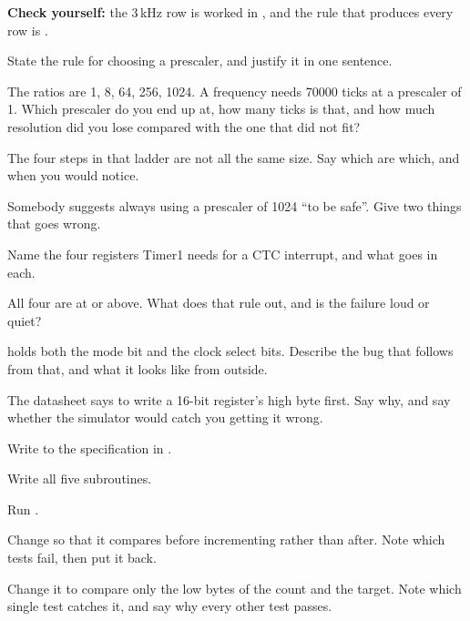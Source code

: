 \noindent\textbf{Check yourself:} the 3\,kHz row is worked in , and the rule
that produces every row is .

\label{c5:ex:choose}
\begin{parts}
  \item State the rule for choosing a prescaler, and justify it in one sentence.
  \item The ratios are 1, 8, 64, 256, 1024. A frequency needs 70000 ticks at a prescaler of 1.
    Which prescaler do you end up at, how many ticks is that, and how much resolution did you lose
    compared with the one that did not fit?
  \item The four steps in that ladder are not all the same size. Say which are which, and when you
    would notice.
  \item Somebody suggests always using a prescaler of 1024 ``to be safe''. Give two things that goes
    wrong.
\end{parts}

\label{c5:ex:registers}
\begin{parts}
  \item Name the four registers Timer1 needs for a CTC interrupt, and what goes in each.
  \item All four are at  or above. What does that rule out, and is the failure loud or
    quiet?
  \item {} holds both the mode bit and the clock select bits. Describe the bug that
    follows from that, and what it looks like from outside.
  \item The datasheet says to write a 16-bit register's high byte first. Say why, and say whether
    the simulator would catch you getting it wrong.
\end{parts}

\label{c5:ex:driver}
Write  to the specification in .
\begin{parts}
  \item Write all five subroutines.
  \item Run .
  \item Change  so that it compares before incrementing rather than after. Note
    which tests fail, then put it back.
  \item Change it to compare only the low bytes of the count and the target. Note which single test
    catches it, and say why every other test passes.
\end{parts}

